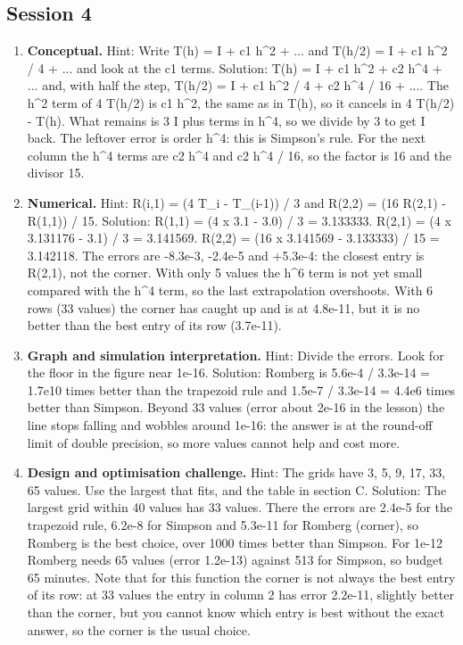 \documentclass[11pt,a4paper]{article}
\begin{document}
\subsection*{Session 4}
\begin{enumerate}[nosep]
\item \textbf{Conceptual.} Hint: Write T(h) = I + c1 h\textasciicircum{}2 + ... and T(h/2) = I + c1 h\textasciicircum{}2 / 4 + ... and look at the c1 terms. Solution: T(h) = I + c1 h\textasciicircum{}2 + c2 h\textasciicircum{}4 + ... and, with half the step, T(h/2) = I + c1 h\textasciicircum{}2 / 4 + c2 h\textasciicircum{}4 / 16 + .... The h\textasciicircum{}2 term of 4 T(h/2) is c1 h\textasciicircum{}2, the same as in T(h), so it cancels in 4 T(h/2) - T(h). What remains is 3 I plus terms in h\textasciicircum{}4, so we divide by 3 to get I back. The leftover error is order h\textasciicircum{}4: this is Simpson's rule. For the next column the h\textasciicircum{}4 terms are c2 h\textasciicircum{}4 and c2 h\textasciicircum{}4 / 16, so the factor is 16 and the divisor 15.
\item \textbf{Numerical.} Hint: R(i,1) = (4 T\_i - T\_(i-1)) / 3 and R(2,2) = (16 R(2,1) - R(1,1)) / 15. Solution: R(1,1) = (4 x 3.1 - 3.0) / 3 = 3.133333. R(2,1) = (4 x 3.131176 - 3.1) / 3 = 3.141569. R(2,2) = (16 x 3.141569 - 3.133333) / 15 = 3.142118. The errors are -8.3e-3, -2.4e-5 and +5.3e-4: the closest entry is R(2,1), not the corner. With only 5 values the h\textasciicircum{}6 term is not yet small compared with the h\textasciicircum{}4 term, so the last extrapolation overshoots. With 6 rows (33 values) the corner has caught up and is at 4.8e-11, but it is no better than the best entry of its row (3.7e-11).
\item \textbf{Graph and simulation interpretation.} Hint: Divide the errors. Look for the floor in the figure near 1e-16. Solution: Romberg is 5.6e-4 / 3.3e-14 = 1.7e10 times better than the trapezoid rule and 1.5e-7 / 3.3e-14 = 4.4e6 times better than Simpson. Beyond 33 values (error about 2e-16 in the lesson) the line stops falling and wobbles around 1e-16: the answer is at the round-off limit of double precision, so more values cannot help and cost more.
\item \textbf{Design and optimisation challenge.} Hint: The grids have 3, 5, 9, 17, 33, 65 values. Use the largest that fits, and the table in section C. Solution: The largest grid within 40 values has 33 values. There the errors are 2.4e-5 for the trapezoid rule, 6.2e-8 for Simpson and 5.3e-11 for Romberg (corner), so Romberg is the best choice, over 1000 times better than Simpson. For 1e-12 Romberg needs 65 values (error 1.2e-13) against 513 for Simpson, so budget 65 minutes. Note that for this function the corner is not always the best entry of its row: at 33 values the entry in column 2 has error 2.2e-11, slightly better than the corner, but you cannot know which entry is best without the exact answer, so the corner is the usual choice.
\end{enumerate}
\end{document}

